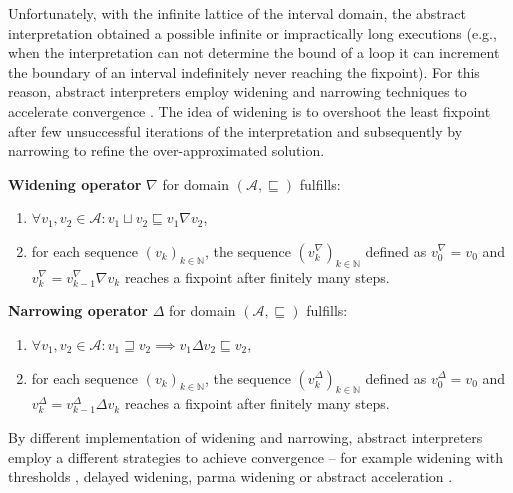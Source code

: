 Unfortunately, with the infinite lattice of the interval
domain, the
abstract interpretation obtained a possible infinite or impractically long
executions (e.g., when the interpretation can not determine the bound of a loop
it can increment the boundary of an interval indefinitely never reaching the
fixpoint). For this reason, abstract interpreters employ widening and
narrowing techniques to accelerate convergence \cite{Cousot1992a, Cortesi2011}.
The idea of widening is to overshoot the least fixpoint after few
unsuccessful iterations of the interpretation and subsequently by narrowing to
refine the over-approximated solution.
\begin{definition}
    \textbf{Widening operator} $\nabla$ for domain $(\mathcal{A},
    \sqsubseteq)$ fulfills:
    \begin{enumerate}
        \item $\forall v_1, v_2 \in \mathcal{A} : v_1 \sqcup v_2 \sqsubseteq v_1 \nabla v_2$,
        \item for each sequence $(v_k)_{k \in \mathbb{N}}$, the sequence $(v^{\nabla}_k)_{k \in \mathbb{N}}$ defined as $v^{\nabla}_0 = v_0$ and $v^{\nabla}_k = v^{\nabla}_{k-1} \nabla v_k$ reaches a fixpoint after finitely many steps.
    \end{enumerate}
\end{definition}
\begin{definition}
    \textbf{Narrowing operator} $\Delta$ for domain $(\mathcal{A},
    \sqsubseteq)$ fulfills:
    \begin{enumerate}
        \item $\forall v_1, v_2 \in \mathcal{A} : v_1 \sqsupseteq v_2 \implies v_1 \Delta v_2 \sqsubseteq v_2$,
        \item for each sequence $(v_k)_{k \in \mathbb{N}}$, the sequence $(v^{\Delta}_k)_{k \in \mathbb{N}}$ defined as $v^{\Delta}_0 = v_0$ and $v^{\Delta}_k = v^{\Delta}_{k-1} \Delta v_k$ reaches a fixpoint after finitely many steps.
    \end{enumerate}
\end{definition}

By different implementation of widening and narrowing, abstract interpreters
employ a different strategies to achieve convergence -- for example widening
with thresholds \cite{Blanchet2003, Lakhdar2011}, delayed widening, parma widening
\cite{Bagnara2008} or abstract acceleration \cite{Gonnord2006, Feautrier2010}.


